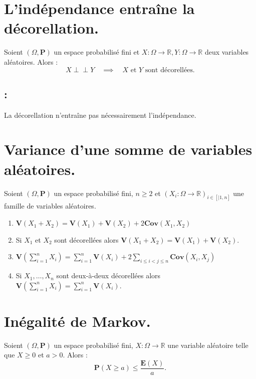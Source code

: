 \documentclass{article}
\begin{document}
\section{L'indépendance entraîne la décorellation.}

Soient $(\Omega, \mathbf{P})$ un espace probabilisé fini et $X : \Omega \longrightarrow \mathbb{R}, Y : \Omega \longrightarrow \mathbb{R}$ deux variables aléatoires. Alors : 
\[  
    X \perp\!\!\!\perp Y \quad \implies \quad X \text{ et } Y \text{ sont décorellées}.
\]  

\subsection*{ :}
La décorellation n'entraîne pas nécessairement l'indépendance. 

\section{Variance d'une somme de variables aléatoires.}
Soient $(\Omega, \mathbf{P})$ un espace probabilisé fini, $n \geq 2$ et $(X_i : \Omega \longrightarrow \mathbb{R})_{i \in [|1, n]}$ une famille de variables aléatoires. 

\begin{enumerate}[label=(\alph*)]
    \item $ \mathbf{V}(X_1 + X_2) = \mathbf{V}(X_1) + \mathbf{V}(X_2) + 2\mathbf{Cov}(X_1, X_2) $ 
    \item Si $X_1$ et $X_2$ sont décorellées alors $ \mathbf{V}(X_1 + X_2) = \mathbf{V}(X_1) + \mathbf{V}(X_2)$.
    \item $ \mathbf{V}\left(\displaystyle \sum_{i = 1}^{n}X_i\right) = \displaystyle\sum_{i=1}^{n} \mathbf{V}(X_i) + 2\displaystyle\sum_{i \leq i < j \leq n} \mathbf{Cov}(X_i, X_j) $
    \item Si $X_1, \ldots, X_n$ sont deux-à-deux décorellées alors $\mathbf{V}\left(\displaystyle\sum_{i=1}^{n}X_i\right) = \displaystyle\sum_{i=1}^{n} \mathbf{V}(X_i)$. 
\end{enumerate}

\section{Inégalité de Markov.}
Soient $(\Omega, \mathbf{P})$ un espace probabilisé fini, $X : \Omega \longrightarrow \mathbb{R}$ une variable aléatoire telle que $X \geq 0$ et $a>0$. Alors : 
\[
    \mathbf{P}(X \geq a) \leq \dfrac{\mathbf{E}(X)}{a}.
\]
\end{document}
